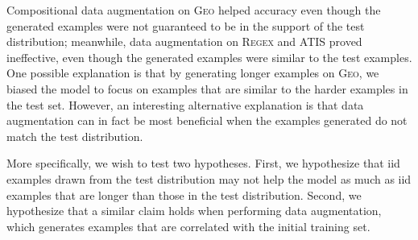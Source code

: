 \documentclass[11pt,letterpaper]{article}
\newcommand{\atis}{\textsc{ATIS}\xspace}
\newcommand{\regex}{\textsc{Regex}\xspace}
\newcommand{\geo}{\textsc{Geo}\xspace}
\begin{document}
Compositional data augmentation on \geo helped accuracy
even though the generated examples were not guaranteed
to be in the support of the test distribution;
meanwhile, data augmentation on \regex and \atis
proved ineffective, even though 
the generated examples were similar to the test examples. 
One possible explanation is that by generating longer examples on
\geo, we biased the model to focus on examples that are similar to the
harder examples in the test set.
However, an interesting alternative explanation is that
data augmentation can in fact be most beneficial when the examples generated
do not match the test distribution.

More specifically, we wish to test two hypotheses.
First, we hypothesize that iid examples drawn from the test distribution 
may not help the model as much as iid examples
that are longer than those in the test distribution.
Second, we hypothesize that 
a similar claim holds when performing data augmentation,
which generates examples that are correlated with the initial training set.
\end{document}

